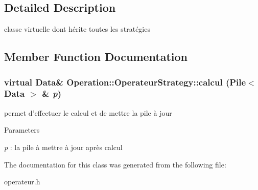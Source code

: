 \subsection{Detailed Description}
classe virtuelle dont hérite toutes les stratégies 

\subsection{Member Function Documentation}
\hypertarget{classOperation_1_1OperateurStrategy_a3a62ee4f37c773e8459f92c41b3127e1}{
\subsubsection[{calcul}]{\setlength{\rightskip}{0pt plus 5cm}virtual {\bf Data}\& Operation::OperateurStrategy::calcul ({\bf Pile}$<$ {\bf Data} $>$ \& {\em p})}}
\label{classOperation_1_1OperateurStrategy_a3a62ee4f37c773e8459f92c41b3127e1}


permet d'effectuer le calcul et de mettre la pile à jour 


\begin{DoxyParams}{Parameters}
\item[{\em p}]: la pile à mettre à jour après calcul \end{DoxyParams}


The documentation for this class was generated from the following file:\begin{DoxyCompactItemize}
\item 
operateur.h\end{DoxyCompactItemize}

